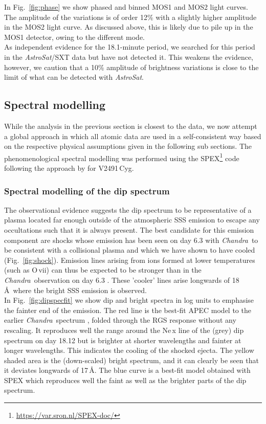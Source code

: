 \documentclass{aa}
\newcommand{\chandra}{{\it Chandra}}
\newcommand{\asat}{{\it AstroSat}}
\begin{document}
In Fig.~\ref{fig:phase} we show phased and binned MOS1 and MOS2 light curves.
The amplitude of the variations is of order 12\% with a slightly higher
amplitude in the MOS2 light curve. As discussed above, this is likely due to
pile up in the MOS1 detector, owing to the different mode.\\

As independent evidence for the 18.1-minute period, we searched for this
period in the \asat/SXT data but have not detected it. This weakens the evidence,
however, we caution that a 10\% amplitude of brightness variations is close
to the limit of what can be detected with \asat.


\subsection{Spectral modelling}
\label{sect:analysis:spex}

While the analysis in the previous section is closest to the data, we now
attempt a global approach in which all atomic data are used in a
self-consistent way based on the respective physical assumptions given in
the following sub sections.
The phenomenological spectral modelling was performed using the SPEX\footnote{\href{https://var.sron.nl/SPEX-doc/}{https://var.sron.nl/SPEX-doc/}} code
\citep{spex,spex2} following the approach by \cite{pinto12} for V2491\,Cyg.

\subsubsection{Spectral modelling of the dip spectrum}
\label{sect:analysis:spexdip}

The observational evidence suggests the dip spectrum to be representative
of a plasma located far enough outside of the atmospheric SSS emission to
escape any occultations such that it is always present. The best candidate
for this emission component are shocks whose emission has been seen
on day 6.3 with \chandra\ to be consistent with a collisional plasma and
which we have shown to have cooled (Fig.~\ref{fig:shock}).
Emission lines arising from ions formed at lower temperatures (such as
O\,{\sc vii}) can thus be expected to be stronger than in the \chandra\
observation on day 6.3 \citep{orio2020}. These 'cooler' lines arise
longwards of 18\,\AA\ where the bright SSS emission is observed.\\

In Fig.~\ref{fig:dipspecfit} we show dip and bright spectra in log units to
emphasise the fainter end of the emission. The red line is the best-fit
APEC model to the earlier \chandra\ spectrum \citep{orio2020}, folded through
the RGS response without any rescaling. It reproduces well the range
around the Ne\,{\sc x} line of the (grey) dip spectrum on day 18.12 but is
brighter at shorter wavelengths and fainter at longer wavelengths. This
indicates the cooling of the shocked ejecta. The yellow
shaded area is the (down-scaled) bright spectrum, and it can clearly be
seen that it deviates longwards of 17\,\AA. The blue curve is a best-fit model
obtained with SPEX which reproduces well the faint as well as
the brighter parts of the dip spectrum.\\
\end{document}

